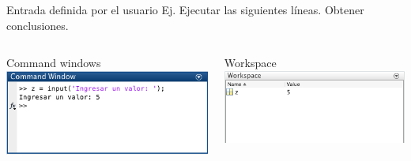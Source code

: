 \documentclass{bredelebeamer}
\begin{document}
\begin{frame}{Entrada definida por el usuario}
Ej. Ejecutar las siguientes líneas. Obtener conclusiones.
\begin{columns}
\begin{column}{0.5\textwidth}
\begin{center}
Command windows
\includegraphics[scale=0.3]{images/pantalla1.png}
\end{center}
\end{column}
\begin{column}{0.3\textwidth}
\begin{center}
Workspace
\includegraphics[scale=0.3]{images/pantalla2.png}
\end{center}
\end{column}
\end{columns}
\end{frame}
\end{document}
